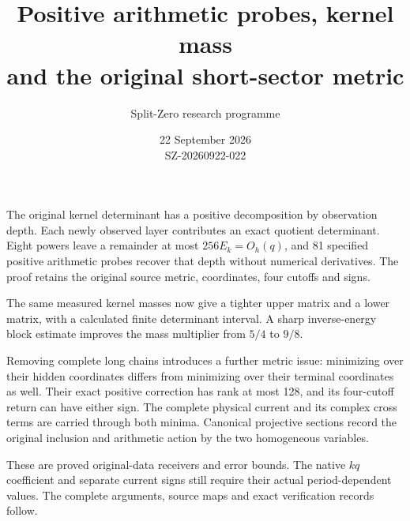 \documentclass[11pt]{article}
\title{Positive arithmetic probes, kernel mass\\and the original short-sector metric}
\author{Split-Zero research programme}
\date{22 September 2026\\SZ-20260922-022}
\begin{document}
\maketitle
The original kernel determinant has a positive decomposition by observation
depth. Each newly observed layer contributes an exact quotient determinant.
Eight powers leave a remainder at most $256E_k=O_h(q)$, and 81 specified
positive arithmetic probes recover that depth without numerical derivatives.
The proof retains the original source metric, coordinates, four cutoffs and signs.

The same measured kernel masses now give a tighter upper matrix and a lower
matrix, with a calculated finite determinant interval. A sharp inverse-energy
block estimate improves the mass multiplier from $5/4$ to $9/8$.

Removing complete long chains introduces a further metric issue:
minimizing over their hidden coordinates differs from minimizing over
their terminal coordinates as well. Their exact positive correction has
rank at most 128, and its four-cutoff return can have either sign.
The complete physical current and its complex cross terms are carried
through both minima. Canonical projective sections record the original
inclusion and arithmetic action by the two homogeneous variables.

These are proved original-data receivers and error bounds. The native
$kq$ coefficient and separate current signs still require their actual
period-dependent values. The complete arguments, source maps and exact
verification records follow.
\begingroup\small\tableofcontents\endgroup\clearpage
\end{document}
